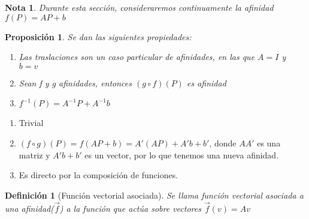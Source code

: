 \documentclass[11pt, a4paper, titlepage]{article}
\makeatletter
\renewenvironment{proof}[1][\proofname] {\vspace{-15pt}\par\pushQED{\qed}\normalfont\topsep6\p@\@plus6\p@\relax\trivlist\item[\hskip\labelsep\it#1\@addpunct{.}]\ignorespaces}{\popQED\endtrivlist\@endpefalse}
\renewcommand{\vec}{\overrightarrow}
\theoremstyle{theorem-style}
\newtheorem*{nprop}{Proposición}
\theoremstyle{definition-style}
\newtheorem*{ndef}{Definición}
\theoremstyle{remark-style}
\newtheorem*{nota}{Nota}
\theoremstyle{example-style}
\newenvironment{nlist}
{\begin{enumerate}
    \renewcommand\labelenumi{(\emph{\roman{enumi})}}}
  {\end{enumerate}}
\makeatother
\begin{document}
\begin{nota}
  Durante esta sección, consideraremos continuamente la afinidad $f(P) = AP + b $
\end{nota}

\begin{nprop}
  Se dan las siguientes propiedades:
  \begin{nlist}
  \item Las traslaciones son un caso particular de afinidades, en las que $A = I$ y $b = v$
  \item Sean f y g afinidades, entonces $(g \circ f) (P)$ es afinidad
  \item $f^{-1}(P) = A^{-1}P +A^{-1}b$
    
  \end{nlist}
\end{nprop}
\begin{proof}
  \begin{nlist}
  \item Trivial
  \item $(f\circ g)(P) = f(AP +b) = A'(AP)+A'b +b' $, donde $AA'$ es una matriz y $A'b+b'$ es un vector, por lo que tenemos una nueva afinidad.
  \item Es directo por la composición de funciones.
  \end{nlist}
\end{proof}

\begin{ndef}[Función vectorial asociada]
  Se llama función vectorial asociada a una afinidad($\vec{f}$) a la función que actúa sobre vectores $\vec{f}(v) = Av$
\end{ndef}
\end{document}
